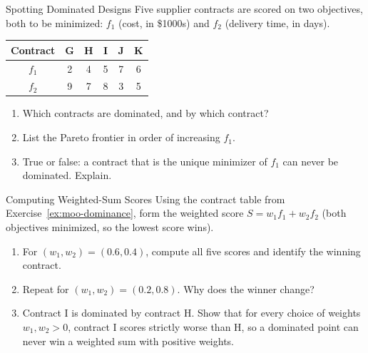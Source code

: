 \begin{ex}{Spotting Dominated Designs}{}
\label{ex:moo-dominance}
Five supplier contracts are scored on two objectives, both to be minimized: $f_1$ (cost, in \$1000s) and $f_2$ (delivery time, in days).

\begin{center}
\begin{tabular}{c|ccccc}
Contract & G & H & I & J & K \\\hline
$f_1$    & 2 & 4 & 5 & 7 & 6 \\
$f_2$    & 9 & 7 & 8 & 3 & 5 \\
\end{tabular}
\par{}\label{tab:multi-objective-optimization_updated-tab01}%

\end{center}

\begin{enumerate}
\item Which contracts are dominated, and by which contract?
\item List the Pareto frontier in order of increasing $f_1$.
\item True or false: a contract that is the unique minimizer of $f_1$ can never be dominated. Explain.
\end{enumerate}
\end{ex}

\begin{ex}{Computing Weighted-Sum Scores}{}
\label{ex:moo-weighted-scores}
Using the contract table from Exercise~\ref{ex:moo-dominance}, form the weighted score $S = w_1 f_1 + w_2 f_2$ (both objectives minimized, so the lowest score wins).
\begin{enumerate}
\item For $(w_1, w_2) = (0.6, 0.4)$, compute all five scores and identify the winning contract.
\item Repeat for $(w_1, w_2) = (0.2, 0.8)$. Why does the winner change?
\item Contract I is dominated by contract H. Show that for every choice of weights $w_1, w_2 > 0$, contract I scores strictly worse than H, so a dominated point can never win a weighted sum with positive weights.
\end{enumerate}
\end{ex}

